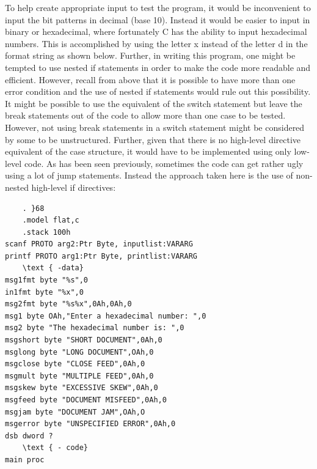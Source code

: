 \documentclass[10pt]{book}
\begin{document}
To help create appropriate input to test the program, it would be inconvenient to input the bit patterns in decimal (base 10). Instead it would be easier to input in binary or hexadecimal, where fortunately C has the ability to input hexadecimal numbers. This is accomplished by using the letter x instead of the letter d in the format string as shown below. Further, in writing this program, one might be tempted to use nested if statements in order to make the code more readable and efficient. However, recall from above that it is possible to have more than one error condition and the use of nested if statements would rule out this possibility. It might be possible to use the equivalent of the switch statement but leave the break statements out of the code to allow more than one case to be tested. However, not using break statements in a switch statement might be considered by some to be unstructured. Further, given that there is no high-level directive equivalent of the case structure, it would have to be implemented using only low-level code. As has been seen previously, sometimes the code can get rather ugly using a lot of jump statements. Instead the approach taken here is the use of non-nested high-level if directives:

\begin{verbatim}
    . }68
    .model flat,c
    .stack 100h
scanf PROTO arg2:Ptr Byte, inputlist:VARARG
printf PROTO arg1:Ptr Byte, printlist:VARARG
    \text { -data}
msg1fmt byte "%s",0
in1fmt byte "%x",0
msg2fmt byte "%s%x",0Ah,0Ah,0
msg1 byte OAh,"Enter a hexadecimal number: ",0
msg2 byte "The hexadecimal number is: ",0
msgshort byte "SHORT DOCUMENT",0Ah,0
msglong byte "LONG DOCUMENT",OAh,0
msgclose byte "CLOSE FEED",0Ah,0
msgmult byte "MULTIPLE FEED",0Ah,0
msgskew byte "EXCESSIVE SKEW",0Ah,0
msgfeed byte "DOCUMENT MISFEED",0Ah,0
msgjam byte "DOCUMENT JAM",OAh,O
msgerror byte "UNSPECIFIED ERROR",0Ah,0
dsb dword ?
    \text { - code}
main proc
\end{verbatim}
\end{document}
